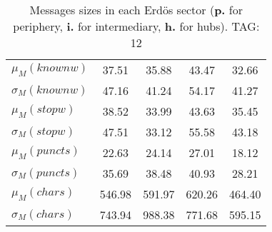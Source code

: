 \begin{table}[h!]
\begin{center}
\begin{tabular}{| l || c | c | c | c |}
$\mu_M(knownw)$ & 37.51  & 35.88  & 43.47  & 32.66 \\
$\sigma_M(knownw)$ & 47.16  & 41.24  & 54.17  & 41.27 \\\hline
$\mu_M(stopw)$ & 38.52  & 33.99  & 43.63  & 35.45 \\
$\sigma_M(stopw)$ & 47.51  & 33.12  & 55.58  & 43.18 \\\hline
$\mu_M(puncts)$ & 22.63  & 24.14  & 27.01  & 18.12 \\
$\sigma_M(puncts)$ & 35.69  & 38.48  & 40.93  & 28.21 \\\hline
$\mu_M(chars)$ & 546.98  & 591.97  & 620.26  & 464.40 \\
$\sigma_M(chars)$ & 743.94  & 988.38  & 771.68  & 595.15 \\\hline
\end{tabular}
\caption{Messages sizes in each Erd\"os sector ({{\bf p.}} for periphery, {{\bf i.}} for intermediary, {{\bf h.}} for hubs). TAG: 12}
\end{center}
\end{table}